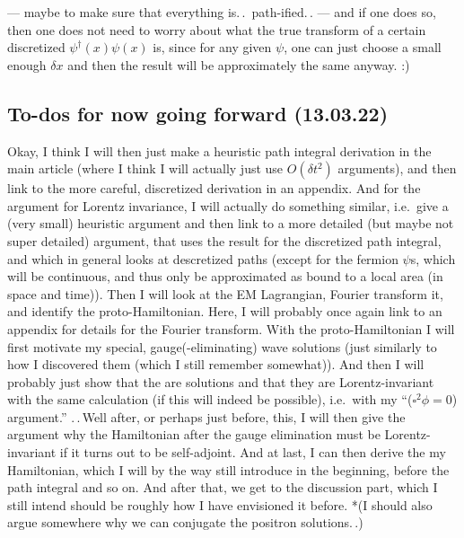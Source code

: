 \documentclass{report}
\begin{document}
--- maybe to make sure that everything is.\,.\, path-ified.\,. --- and if one does so, then one does not need to worry about what the true transform of a certain discretized $\psi^\dagger(x)\psi(x)$ is, since for any given $\psi$, one can just choose a small enough $\delta x$ and then the result will be approximately the same anyway. :) %


\subsection{To-dos for now going forward (13.03.22)}
Okay, I think I will then just make a heuristic path integral derivation in the main article (where I think I will actually just use $O(\delta t^2)$ arguments), and then link to the more careful, discretized derivation in an appendix. And for the argument for Lorentz invariance, I will actually do something similar, i.e.\ give a (very small) heuristic argument and then link to a more detailed (but maybe not super detailed) argument, that uses the result for the discretized path integral, and which in general looks at descretized paths (except for the fermion $\psi$s, which will be continuous, and thus only be approximated as bound to a local area (in space and time)). Then I will look at the EM Lagrangian, Fourier transform it, and identify the proto-Hamiltonian. Here, I will probably once again link to an appendix for details for the Fourier transform. With the proto-Hamiltonian I will first motivate my special, gauge(-eliminating) wave solutions (just similarly to how I discovered them (which I still remember somewhat)). And then I will probably just show that the are solutions and that they are Lorentz-invariant with the same calculation (if this will indeed be possible), i.e.\ with my ``($\square^2\phi=0$) argument.'' .\,.\,Well after, or perhaps just before, this, I will then give the argument why the Hamiltonian after the gauge elimination must be Lorentz-invariant if it turns out to be self-adjoint. And at last, I can then derive the my Hamiltonian, which I will by the way still introduce in the beginning, before the path integral and so on. And after that, we get to the discussion part, which I still intend should be roughly how I have envisioned it before. *(I should also argue somewhere why we can conjugate the positron solutions.\,.)
\end{document}
